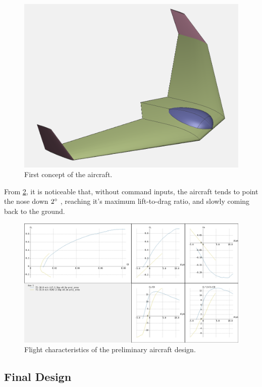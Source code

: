\begin{figure}
\centering
  \includegraphics[width=\linewidth]{figs/preliminar.png}
  \caption{First concept of the aircraft.}
  \label{fig:preliminar}
\end{figure}


From \ref{fig:craftpolar}, it is noticeable that, without command inputs, the aircraft tends to point the nose down $ 2 \degree $ , reaching it's maximum lift-to-drag ratio, and slowly coming back to the ground.

\begin{figure}
\centering
  \includegraphics[width=\linewidth]{figs/craftpolar.png}
  \caption{Flight characteristics of the preliminary aircraft design.}
  \label{fig:craftpolar}
\end{figure}


\subsection{Final Design}

